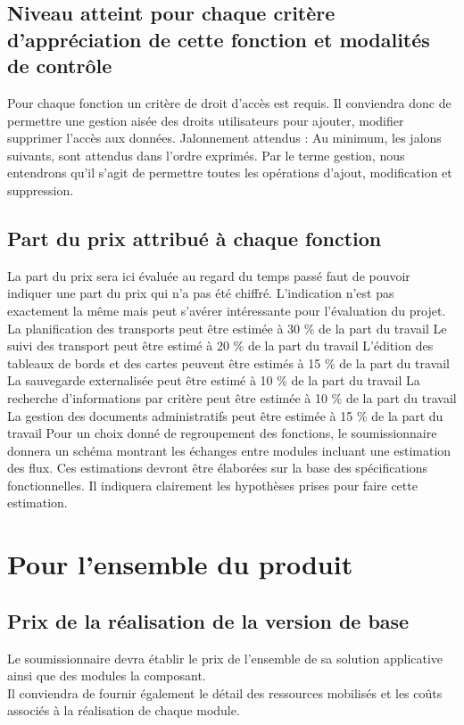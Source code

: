 \documentclass[11pt,fleqn]{book} %
\begin{document}
\subsection{Niveau atteint pour chaque critère d'appréciation de cette fonction et modalités de contrôle}
Pour chaque fonction un critère de droit d'accès est requis. Il conviendra donc de permettre une gestion aisée des droits utilisateurs pour ajouter, modifier supprimer l'accès aux données.
Jalonnement attendus :
Au minimum, les jalons suivants, sont attendus dans l'ordre exprimés. Par le terme \og{}gestion\fg{}, nous entendrons qu'il s'agit de permettre toutes les opérations d'ajout, modification et suppression.

\subsection{Part du prix attribué à chaque fonction}
La part du prix sera ici évaluée au regard du temps passé faut de pouvoir indiquer une part du prix qui n'a pas été chiffré. L'indication n'est pas exactement la même mais peut s'avérer intéressante pour l'évaluation du projet. 
La planification des transports peut être estimée à 30 \% de la part du travail
Le suivi des transport peut être estimé à 20 \% de la part du travail
L'édition des tableaux de bords et des cartes peuvent être estimés à 15 \% de la part du travail
La sauvegarde externalisée peut être estimé à 10 \% de la part du travail
La recherche d'informations par critère peut être estimée à 10 \% de la part du travail
La gestion des documents administratifs peut être estimée à 15 \% de la part du travail
Pour un choix donné de regroupement des fonctions, le soumissionnaire donnera un schéma montrant les échanges entre modules incluant une estimation des flux. 
Ces estimations devront être élaborées sur la base des spécifications fonctionnelles. Il indiquera clairement les hypothèses prises pour faire cette estimation. 

\section{Pour l'ensemble du produit}

\subsection{Prix de la réalisation de la version de base}
Le soumissionnaire devra établir le prix de l'ensemble de sa solution applicative ainsi que des modules la composant.
\\
Il conviendra de fournir également le détail des ressources mobilisés et les coûts associés à la réalisation de chaque module. 
\end{document}
